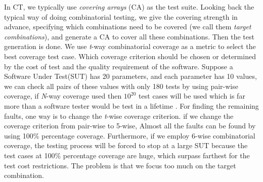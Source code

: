 \documentclass[10pt,conference, compsocconf]{IEEEtran}
\begin{document}
\begin{CJK}{UTF8}{gkai}
In CT, we typically use \emph{covering arrays} (CA) as the test suite.
Looking back the typical way of doing combinatorial testing, we give the
covering strength in advance, specifying which combinations need to be covered
(we call them \emph{target combinations}), and generate a CA to cover all these
combinations.
Then the test generation is done. We use \emph{t}-way combinatorial coverage
as a metric to select the best coverage test case.
Which coverage criterion should be chosen or determined by the cost of test
and the quality requirement of the software. 
Suppose a Software Under Test(SUT) has 20 parameters, and each parameter has 10 
values, we can check all pairs of these values with only 180 tests by 
using pair-wise coverage, 
if \emph{N}-way coverage used then $10^{20}$ test
cases will be used which is far more than a software tester would be 
test in a lifetime \cite{Kuhn2009computer}.
For finding the remaining faults,
one way is to change the \emph{t}-wise coverage criterion. 
if we change the coverage criterion from pair-wise to 5-wise, Almost all the faults
can be found by using 100\% percentage coverage. Furthermore, if we employ 6-wise 
combinatorial coverage, the testing process will be forced to stop at a large SUT 
because the test cases at 100\% percentage coverage are huge, which surpass farthest 
for the test cost restrictions.
The problem is that we focus too much on the target combination. 


\end{CJK}
\end{document}
